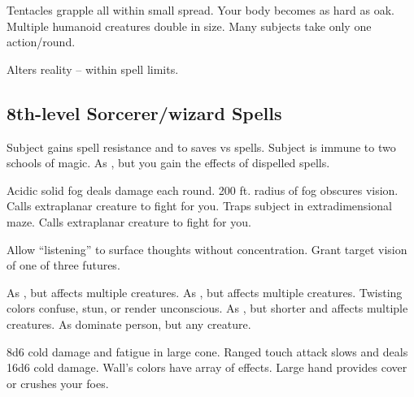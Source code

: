 \begin{swspelllist}
   Tentacles grapple all within small spread.
   Your body becomes as hard as oak.
   Multiple humanoid creatures double in size.
   Many subjects take only one action/round.

  \M Alters reality -- within spell limits.
\end{swspelllist}

\subsection{8th-level Sorcerer/wizard Spells} 
\begin{swspelllist}
  \M\F Subject gains spell resistance and  to saves vs spells.
   Subject is immune to two schools of magic.
   As , but you gain the effects of dispelled spells.

   Acidic solid fog deals damage each round.
   200 ft. radius of fog obscures vision.
   Calls extraplanar creature to fight for you.
   Traps subject in extradimensional maze.
   Calls extraplanar creature to fight for you.

   Allow ``listening'' to surface thoughts without concentration.
   Grant target vision of one of three futures.

   As , but affects multiple creatures.
   As , but affects multiple creatures.
   Twisting colors confuse, stun, or render unconscious.
   As , but shorter and affects multiple creatures.
   As dominate person, but any creature.

   8d6 cold damage and fatigue in large cone.
   Ranged touch attack slows and deals 16d6 cold damage.
   Wall's colors have array of effects.
   Large hand provides cover or crushes your foes.


\end{swspelllist}
